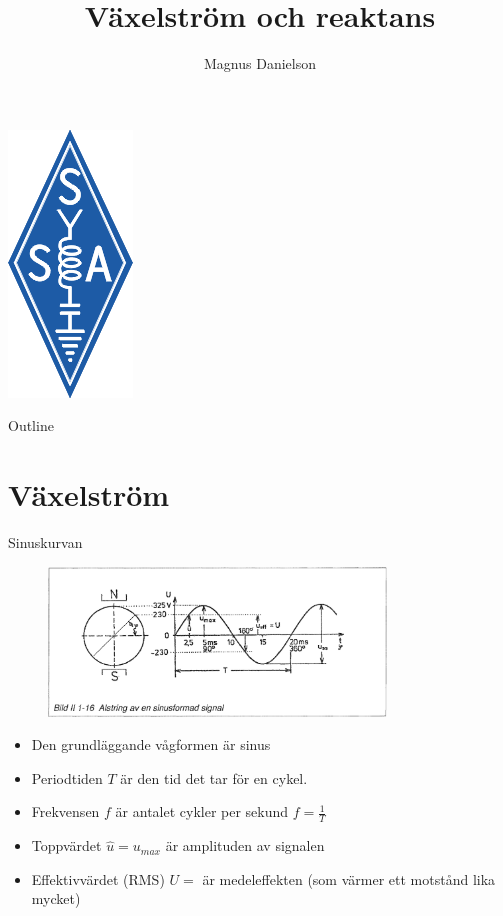 \documentclass{beamer}
\title{Växelström och reaktans}
\author{Magnus Danielson}
\begin{document}
\begin{frame}
\titlepage
\includegraphics[height=0.4\textheight]{images/ssalogo}
\end{frame}

\begin{frame}{Outline}
\tableofcontents
\end{frame}

\section{Växelström}

\begin{frame}{Sinuskurvan}

\begin{figure}[h]
\includegraphics[width=0.8\textwidth]{images/bild_2_1-16}
\label{fig:BildII1-16}
\end{figure}

\begin{itemize}
\item Den grundläggande vågformen är sinus
\item Periodtiden $T$ är den tid det tar för en cykel.
\item Frekvensen $f$ är antalet cykler per sekund $f=\frac{1}{T}$
\item Toppvärdet $\hat{u}=u_{max}$ är amplituden av signalen
  \item Effektivvärdet (RMS) $U = $ är medeleffekten (som värmer ett motstånd lika mycket)
\end{itemize}
\end{frame}
\end{document}
